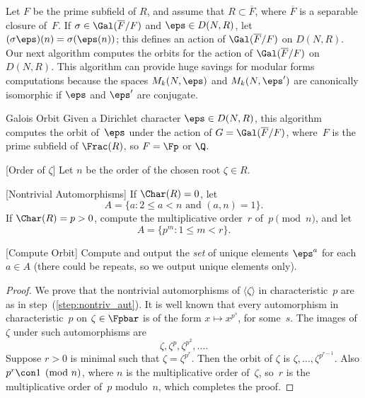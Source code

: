 Let $F$ be the prime subfield of $R$, and assume
that $R\subset \overline{F}$, where $\overline{F}$
is a separable closure of~$F$.  If $\sigma \in \Gal(\overline{F}/F)$
and $\eps \in D(N,R)$, let $(\sigma\eps)(n) = \sigma(\eps(n))$;
this defines an action of $\Gal(\overline{F}/F)$ on $D(N,R)$.
Our next algorithm computes the orbits for
the action of $\Gal(\overline{F}/F)$ on $D(N,R)$.  This
algorithm can provide huge savings for modular
forms computations because the spaces $M_k(N,\eps)$
and $M_k(N,\eps')$ are canonically isomorphic if $\eps$
and $\eps'$ are conjugate.
\begin{algorithm}{Galois Orbit}
Given a Dirichlet character $\eps\in D(N,R)$, this algorithm
computes the orbit of~$\eps$ under the action of $G=\Gal(\overline{F}/F)$,
where~$F$ is the prime subfield of $\Frac(R)$, so $F=\Fp$ or $\Q$.
\begin{steps}
\item{}[Order of $\zeta$] Let $n$ be the order of the chosen root $\zeta\in R$.
\item{}[Nontrivial Automorphisms]\label{step:nontriv_aut}
If $\Char(R)=0$, let
$$
 A = \{a : 2\leq a <n \text{ and }(a,n) = 1\}.
$$
If $\Char(R)=p>0$, compute the multiplicative order~$r$ of~$p\!\!\pmod{n}$,
and let
$$
  A = \{p^m : 1\leq m < r\}.
$$
\item{}[Compute Orbit] Compute and output the {\em set} of unique elements $\eps^a$ 
for each $a\in A$ (there could be repeats, so we output unique elements only).
\end{steps}
\end{algorithm}
\begin{proof}
  We prove that the nontrivial automorphisms of $\langle \zeta\rangle$
  in characteristic~$p$ are as in step~(\ref{step:nontriv_aut}).  It is
  well known that every automorphism in characteristic~$p$ on
  $\zeta\in\Fpbar$ is of the form $x\mapsto x^{p^s}$, for some~$s$.
  The images of $\zeta$ under such automorphisms are
$$
  \zeta, \zeta^p, \zeta^{p^2}, \ldots.
$$
Suppose $r>0$ is minimal such that $\zeta=\zeta^{p^r}$.  Then the
orbit of $\zeta$ is $\zeta,\ldots, \zeta^{p^{r-1}}$.
Also $p^r\con 1\pmod{n}$, where $n$ is the multiplicative order of~$\zeta$,
so~$r$ is the multiplicative order of~$p$ modulo~$n$, which completes
the proof.
\end{proof}

